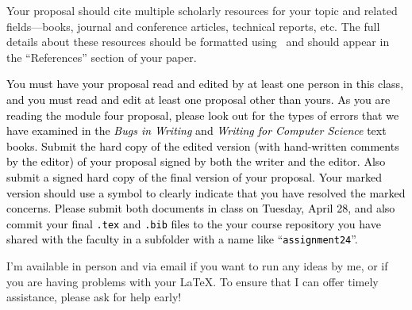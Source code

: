 Your proposal should cite multiple scholarly resources for your topic and related fields---books, journal and conference
articles, technical reports, etc. The full details about these resources should be formatted using \BibTeX\ and should
appear in the ``References'' section of your paper.

\textcolor{black}{You must have your proposal read and edited by at least one person in this class, and you must read
  and edit at least one proposal other than yours.  As you are reading the module four proposal, please look out for the
  types of errors that we have examined in the {\em Bugs in Writing} and {\em Writing for Computer Science} text books.
  Submit the hard copy of the edited version (with hand-written comments by the editor) of your proposal signed by both
  the writer and the editor.  Also submit a signed hard copy of the final version of your proposal.  Your marked version
  should use a symbol to clearly indicate that you have resolved the marked concerns. Please submit both documents in
  class on Tuesday, April 28, and also commit your final {\tt .tex} and {\tt .bib} files to the your course repository
you have shared with the faculty in a subfolder with a name like ``{\tt assignment24}''.}

I'm available in person and via email if you want to run any ideas by me, or if you are having problems with your
\LaTeX. To ensure that I can offer timely assistance, please ask for help early!



